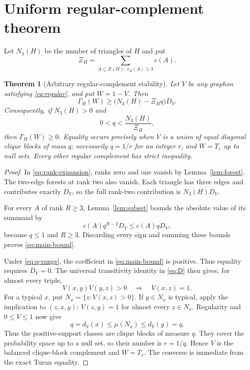\documentclass[11pt]{article}
\newtheorem{theorem}{Theorem}[section]
\begin{document}
\section{Uniform regular-complement theorem}

Let $N_3(H)$ be the number of triangles of $H$ and put
\begin{equation}
 \Xi_H=\sum_{A\subseteq E(H):\ r_H(A)\geq3}c(A).
 \label{eq:Xi}
\end{equation}

\begin{theorem}[Arbitrary regular-complement stability]
\label{thm:regular}
Let $V$ be any graphon satisfying \eqref{eq:regular}, and put $W=1-V$.
Then
\begin{equation}
 \Gamma_H(W)\geq
 \bigl(N_3(H)-\Xi_Hq\bigr)D_V.
 \label{eq:main-bound}
\end{equation}
Consequently, if $N_3(H)>0$ and
\begin{equation}
 0<q<\frac{N_3(H)}{\Xi_H},
 \label{eq:q-range}
\end{equation}
then $\Gamma_H(W)\geq0$.  Equality occurs precisely when $V$ is a union of
equal diagonal clique blocks of mass $q$; necessarily $q=1/r$ for an
integer $r$, and $W=T_r$ up to null sets.  Every other regular complement
has strict inequality.
\end{theorem}

\begin{proof}
In \eqref{eq:rank-expansion}, ranks zero and one vanish by
Lemma~\ref{lem:forest}.  The two-edge forests at rank two also vanish.  Each
triangle has three edges and contributes exactly $D_V$, so the full
rank-two contribution is $N_3(H)D_V$.

For every $A$ of rank $R\geq3$, Lemma~\ref{lem:subset} bounds the absolute
value of its summand by
\[
 c(A)q^{R-2}D_V\leq c(A)qD_V,
\]
because $q\leq1$ and $R\geq3$.  Discarding every sign and summing these
bounds proves \eqref{eq:main-bound}.

Under \eqref{eq:q-range}, the coefficient in \eqref{eq:main-bound} is
positive.  Thus equality requires $D_V=0$.  The universal transitivity
identity in \eqref{eq:D} then gives, for almost every triple,
\[
 V(x,y)V(y,z)>0\quad\Longrightarrow\quad V(x,z)=1.
\]
For a typical $x$, put $N_x=\{z:V(x,z)>0\}$.  If $y\in N_x$ is typical,
apply the implication to $(z,x,y)$: $V(z,y)=1$ for almost every
$z\in N_x$.  Regularity and $0\leq V\leq1$ now give
\[
 q=d_V(x)\leq\mu(N_x)\leq d_V(y)=q.
\]
Thus the positive-support classes are clique blocks of measure $q$.
They cover the probability space up to a null set, so their number is
$r=1/q$.  Hence $V$ is the balanced clique-block complement and $W=T_r$.
The converse is immediate from the exact Turan equality.
\end{proof}
\end{document}
